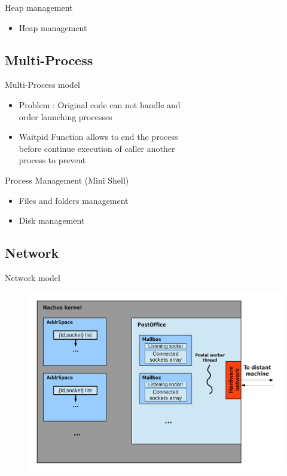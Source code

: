 \documentclass{beamer}
\begin{document}
\begin{frame}{Heap management}
  \begin{itemize}
    \item Heap management
  \end{itemize}
\end{frame}

\subsection{Multi-Process}
\begin{frame}{Multi-Process model}
  \begin{itemize}
	\item Problem : Original code can not handle and
	\\order launching processes
    \item Waitpid Function allows to end the process 
    \\before continue execution of caller another
    \\process to prevent
  \end{itemize}
\end{frame}

\begin{frame}{Process Management (Mini Shell)}
  \begin{itemize}
    \item Files and folders management
    \item Disk management
  \end{itemize}
\end{frame}

\subsection{Network}
\begin{frame}{Network model}
    \begin{figure}[ht]
		\includegraphics[width=0.7\linewidth]{Networkcolored.pdf}
    \end{figure}
\end{frame}
\end{document}
